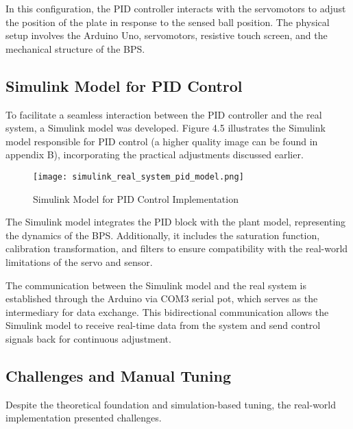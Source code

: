 In this configuration, the PID controller interacts with the servomotors to adjust the position of the plate in response to the sensed ball position. The physical setup involves the Arduino Uno, servomotors, resistive touch screen, and the mechanical structure of the BPS.

\subsection{Simulink Model for PID Control}

To facilitate a seamless interaction between the PID controller and the real system, a Simulink model was developed. Figure 4.5 illustrates the Simulink model responsible for PID control (a higher quality image can be found in appendix B), incorporating the practical adjustments discussed earlier.

\begin{figure}[h]
    \centering
    \texttt{[image: simulink\_real\_system\_pid\_model.png]}
    \caption{Simulink Model for PID Control Implementation}
    \label{fig:simulink-pid-model}
\end{figure}

The Simulink model integrates the PID block with the plant model, representing the dynamics of the BPS. Additionally, it includes the saturation function, calibration transformation, and filters to ensure compatibility with the real-world limitations of the servo and sensor.

The communication between the Simulink model and the real system is established through the Arduino via COM3 serial pot, which serves as the intermediary for data exchange. This bidirectional communication allows the Simulink model to receive real-time data from the system and send control signals back for continuous adjustment.

\subsection{Challenges and Manual Tuning}

Despite the theoretical foundation and simulation-based tuning, the real-world implementation presented challenges. 

